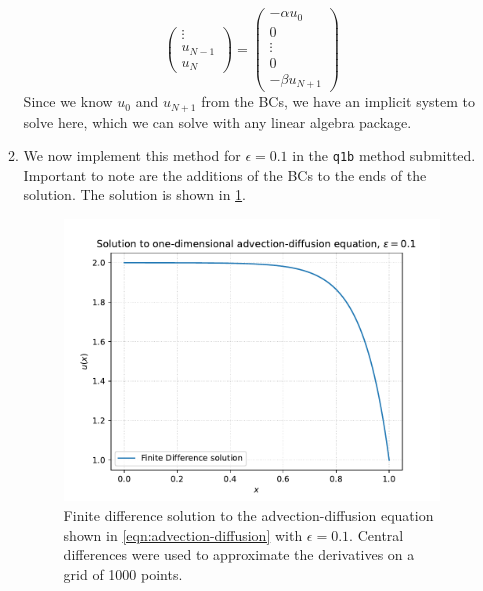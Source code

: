 \documentclass[11pt]{article}
\begin{document}
\begin{enumerate}
\begin{enumerate}
\begin{equation*}
\begin{pmatrix}
                \vdots \\
                u_{N-1} \\
                u_N
            \end{pmatrix}
            =
            \begin{pmatrix}
                -\alpha u_0 \\
                0 \\
                \vdots \\
                0 \\
                -\beta u_{N+1}
            \end{pmatrix}
        \end{equation*}
        Since we know $u_0$ and $u_{N+1}$ from the BCs, we have an implicit system to solve here, which we can solve with any linear algebra package.

        \item We now implement this method for $\epsilon=0.1$ in the \texttt{q1b} method submitted. Important to note are the additions of the BCs to the ends of the solution. The solution is shown in \cref{fig:q1b}. 
        
        \begin{figure}[h]
            \begin{center}
                \includegraphics[width=.6\textwidth]{Plots/q1b.pdf}
                \caption{Finite difference solution to the advection-diffusion equation shown in \cref{eqn:advection-diffusion} with $\epsilon=0.1$. Central differences were used to approximate the derivatives on a grid of 1000 points.}
                \label{fig:q1b}
            \end{center}
        \end{figure}
        

\end{enumerate}
\end{enumerate}
\end{document}
